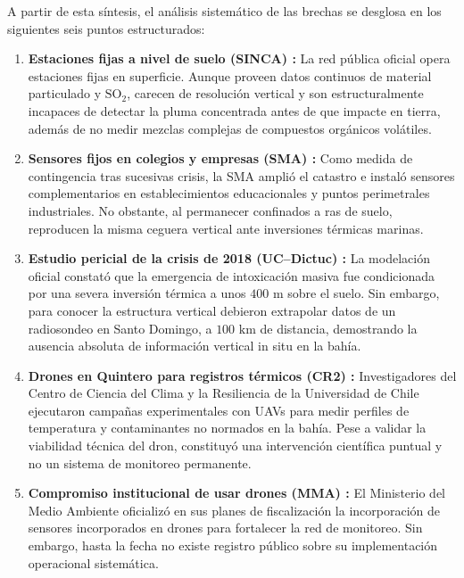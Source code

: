 \documentclass[letterpaper,12pt]{article}
\begin{document}
A partir de esta síntesis, el análisis sistemático de las brechas se desglosa en los siguientes seis puntos estructurados:

\begin{enumerate}
    \item \textbf{Estaciones fijas a nivel de suelo (SINCA) \cite{mma_sinca_2021}:} La red pública oficial opera estaciones fijas en superficie. Aunque proveen datos continuos de material particulado y $\text{SO}_2$, carecen de resolución vertical y son estructuralmente incapaces de detectar la pluma concentrada antes de que impacte en tierra, además de no medir mezclas complejas de compuestos orgánicos volátiles.
    
    \item \textbf{Sensores fijos en colegios y empresas (SMA) \cite{sma_estrategia_2023}:} Como medida de contingencia tras sucesivas crisis, la SMA amplió el catastro e instaló sensores complementarios en establecimientos educacionales y puntos perimetrales industriales. No obstante, al permanecer confinados a ras de suelo, reproducen la misma ceguera vertical ante inversiones térmicas marinas.
    
    \item \textbf{Estudio pericial de la crisis de 2018 (UC--Dictuc) \cite{sma_dictuc}:} La modelación oficial constató que la emergencia de intoxicación masiva fue condicionada por una severa inversión térmica a unos $400\text{ m}$ sobre el suelo. Sin embargo, para conocer la estructura vertical debieron extrapolar datos de un radiosondeo en Santo Domingo, a $100\text{ km}$ de distancia, demostrando la ausencia absoluta de información vertical in situ en la bahía.
    
    \item \textbf{Drones en Quintero para registros térmicos (CR2) \cite{cr2_campana_2022}:} Investigadores del Centro de Ciencia del Clima y la Resiliencia de la Universidad de Chile ejecutaron campañas experimentales con UAVs para medir perfiles de temperatura y contaminantes no normados en la bahía. Pese a validar la viabilidad técnica del dron, constituyó una intervención científica puntual y no un sistema de monitoreo permanente.
    
    \item \textbf{Compromiso institucional de usar drones (MMA) \cite{mma_plan_2023}:} El Ministerio del Medio Ambiente oficializó en sus planes de fiscalización la incorporación de sensores incorporados en drones para fortalecer la red de monitoreo. Sin embargo, hasta la fecha no existe registro público sobre su implementación operacional sistemática.
    

\end{enumerate}
\end{document}
